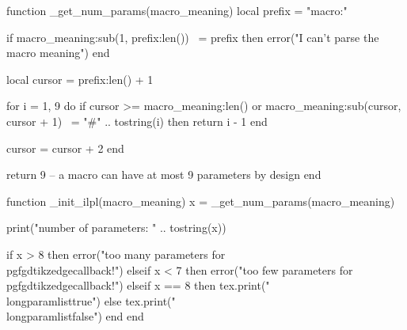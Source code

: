 
\usetikzlibrary{graphs}
\usetikzlibrary{graphdrawing}
\usetikzlibrary{decorations}
\usetikzlibrary{decorations.pathmorphing, decorations.pathreplacing}



\let\oldedgecallback=\pgfgdtikzedgecallback
\def\saveedgepath#1#2{} %

%
\usepackage{luacode}

\begin{luacode}
function _get_num_params(macro_meaning)
    local prefix = "macro:"

    if macro_meaning:sub(1, prefix:len()) ~= prefix then
        error("I can't parse the macro meaning")
    end
    
    local cursor = prefix:len() + 1
    
    for i = 1, 9 do
        if cursor >= macro_meaning:len() or 
           macro_meaning:sub(cursor, cursor + 1) ~= "#" .. tostring(i) then
            return i - 1
        end
        
        cursor = cursor + 2
    end
    
    return 9 -- a macro can have at most 9 parameters by design
end

function _init_ilpl(macro_meaning)
    x = _get_num_params(macro_meaning)

    print("number of parameters: " .. tostring(x))

    if x > 8 then
        error("too many parameters for \\pgfgdtikzedgecallback!")
    elseif x < 7 then
        error("too few parameters for \\pgfgdtikzedgecallback!")
    elseif x == 8 then
        tex.print("\\longparamlisttrue")
    else
        tex.print("\\longparamlistfalse")
    end
end
\end{luacode}

\newif\iflongparamlist
{}

